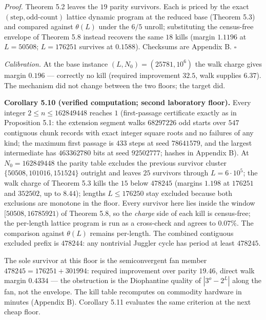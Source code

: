 \documentclass[12pt]{article}
\begin{document}
\emph{Proof.} Theorem 5.2 leaves the \(19\) parity survivors. Each is
priced by the exact \((\text{step},\text{odd-count})\) lattice dynamic
program at the reduced base (Theorem 5.3) and compared against
\(\theta(L)\) under the \(6/5\) unroll; substituting the census-free
envelope of Theorem 5.8 instead recovers the same \(18\) kills (margin
\(1.1196\) at \(L=50508\); \(L=176251\) survives at \(0.1588\)).
Checksums are Appendix B. \(\square\)

\emph{Calibration.} At the base instance \((L,N_0)=(25781,10^6)\) the
walk charge gives margin \(0.196\) --- correctly no kill (required
improvement \(32.5\), walk supplies \(6.37\)). The mechanism did not
change between the two floors; the target did.

\textbf{Corollary 5.10 (verified computation; second laboratory floor).}
Every integer \(2\le n\le 162849448\) reaches \(1\) (first-passage
certificate exactly as in Proposition 5.1: the extension segment walks
\(68297226\) odd starts over \(547\) contiguous chunk records with exact
integer square roots and no failures of any kind; the maximum first
passage is \(433\) steps at seed \(78641579\), and the largest
intermediate has \(463362780\) bits at seed \(92502777\); hashes in
Appendix B). At \(N_0=162849448\) the parity table excludes the previous
survivor cluster \(\{50508,101016,151524\}\) outright and leaves \(25\)
survivors through \(L=6\cdot 10^5\); the walk charge of Theorem 5.3
kills the \(15\) below \(478245\) (margins \(1.198\) at \(176251\) and
\(352502\), up to \(8.44\)); lengths \(L\le 176250\) stay excluded
because both exclusions are monotone in the floor. Every survivor here
lies inside the window \([50508,16785921)\) of Theorem 5.8, so the
\emph{charge} side of each kill is census-free; the per-length lattice
program is run as a cross-check and agrees to \(0.07\%\). The comparison
against \(\theta(L)\) remains per-length. The combined contiguous
excluded prefix is \(478244\): any nontrivial Juggler cycle has period
at least \(478245\).

The sole survivor at this floor is the semiconvergent fan member
\(478245=176251+301994\): required improvement over parity \(19.46\),
direct walk margin \(0.4334\) --- the obstruction is the Diophantine
quality of \(|3^o-2^L|\) along the fan, not the envelope. The kill table
recomputes on commodity hardware in minutes (Appendix B). Corollary 5.11
evaluates the same criterion at the next cheap floor.
\end{document}
